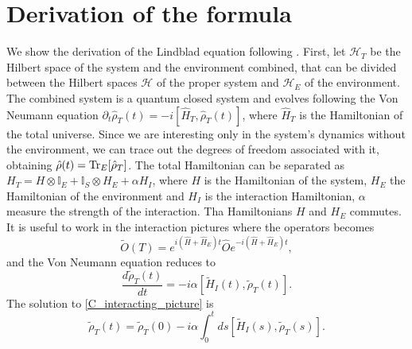 \section{Derivation of the formula}
We show the derivation of the Lindblad equation following \cite{Manzano,Breuer-Petruccione}.
First, let $\mathcal{H}_T$ be the Hilbert space of the system and the environment combined, that can be divided between the Hilbert spaces $\mathcal{H}$ of the proper system and $\mathcal{H}_E$ of the environment. The combined system is a quantum closed system and evolves following the Von Neumann equation $\partial_t\hat\rho_T(t) = -i[\hat H_T,\hat\rho_T(t)]$, where $\hat H_T$ is the Hamiltonian of the total universe.
Since we are interesting only in the system's dynamics without the environment, we can trace out the degrees of freedom associated with it, obtaining $\hat\rho(t) = \operatorname{Tr}_E[\hat\rho_T]$. The total Hamiltonian can be separated as $H_T = H \otimes \mathbb{I}_E + \mathbb{I}_S \otimes H_E + \alpha H_I$, where $H$ is the Hamiltonian of the system, $H_E$ the Hamiltonian of the environment and $H_I$ is the interaction Hamiltonian, $\alpha$  measure the strength of the interaction. Tha Hamiltonians $H$ and $H_E$ commutes.
It is useful to work in the interaction pictures where the operators becomes
\begin{equation}
    \tilde O(T) = e^{i(\hat H+\hat H_E)t}\hat O e^{-i(\hat H+\hat H_E)t},
\end{equation}
and the Von Neumann equation reduces to 
\begin{equation}\label{C_interacting_picture}
    \frac{d\tilde\rho_T(t)}{dt}= -i\alpha\left[\tilde H_I(t),\tilde\rho_T(t)\right].
\end{equation}  
The solution to \eqref{C_interacting_picture} is 
\begin{equation}\label{interacting_picture_exact_solution}
    \tilde\rho_T(t) = \tilde\rho_T(0) -i\alpha\int_{0}^{t}ds\left[\tilde H_I(s),\tilde\rho_T(s)\right].
\end{equation}

